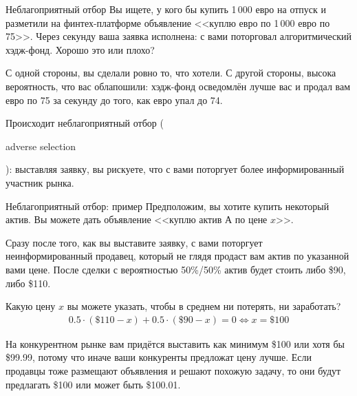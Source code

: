 \documentclass{beamer}
\newcommand{\en}[1]{\begin{otherlanguage}{english}#1\end{otherlanguage}}
\begin{document}
\begin{frame}{Неблагоприятный отбор}
\justify
Вы ищете, у кого бы купить 1\,000 евро на отпуск и разметили на финтех-платформе
объявление <<куплю евро по 1\,000 евро по 75>>. Через секунду ваша заявка 
исполнена: с вами поторговал алгоритмический хэдж-фонд. Хорошо это или плохо?

\justify
С одной стороны, вы сделали ровно то, что хотели. С другой стороны, высока 
вероятность, что вас облапошили: хэдж-фонд осведомлён лучше вас и продал вам
евро по 75 за секунду до того, как евро упал до 74.

\justify
Происходит \alert{неблагоприятный отбор} (\en{adverse selection}): выставляя 
заявку, вы рискуете, что с вами поторгует более информированный участник рынка.
\end{frame}



\begin{frame}{Неблагоприятный отбор: пример}
\justify
Предположим, вы хотите купить некоторый актив. Вы можете дать объявление 
<<куплю актив А по цене $x$>>.

\justify
Сразу после того, как вы выставите заявку, с вами поторгует неинформированный 
продавец, который не глядя продаст вам актив по указанной вами цене. После 
сделки с вероятностью 50\%/50\% актив будет стоить либо \$90, либо \$110.

\justify
Какую цену $x$ вы можете указать, чтобы в среднем ни потерять, ни заработать?
\begin{align*}
0.5\cdot(\$110 - x) + 0.5\cdot(\$90 - x) = 0 \Leftrightarrow x = \$100
\end{align*}

\justify
На конкурентном рынке вам придётся выставить как минимум \$100 или хотя бы  
\$99.99, потому что иначе ваши конкуренты предложат цену лучше. Если продавцы 
тоже размещают объявления и решают похожую задачу, то они будут предлагать \$100 
или может быть \$100.01.
\end{frame}
\end{document}
